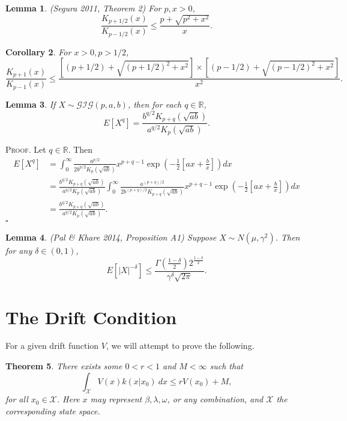 \documentclass[12pt]{article}
\newtheorem{theorem}{Theorem}
\newtheorem{lemma}[theorem]{Lemma}
\newtheorem{corollary}[theorem]{Corollary}
\newcounter{ProofCounter}
\newenvironment{Proof}{\stepcounter{ProofCounter}\textsc{Proof.}}{\hfill$\square$}
\begin{document}
\begin{lemma}
  (Segura 2011, Theorem 2)
  For $p, x > 0$, 
  \[
    \frac{K_{p+1/2}(x)}{K_{p-1/2}(x)} \leq \frac{p + \sqrt{p^2 + x^2}}{x}.
  \]
  \label{l4}
\end{lemma} 

\begin{corollary}
  For $x > 0, p > 1/2$,
  \[
    \frac{K_{p+1}(x)}{K_{p-1}(x)} \leq \frac{\left[(p+1/2) + \sqrt{(p+1/2)^2 + x^2}\right]\times\left[(p-1/2) + \sqrt{(p-1/2)^2 + x^2}\right]}{x^2}.
  \]
  \label{c1}
\end{corollary}

\begin{lemma}
  If $X \sim \mathcal{GIG}(p, a, b)$, then for each $q \in \mathbb{R}$,
  \[
    E[X^q] =\frac{b^{q/2}K_{p+q}(\sqrt{ab})}{a^{q/2}K_p(\sqrt{ab})}.
  \]
  \label{l5}
\end{lemma}
\begin{Proof}
  Let $q \in \mathbb{R}$. Then 
  \begin{align*}
    E[X^q] & = \int_{0}^{\infty} \frac{a^{p/2}}{2b^{p/2}K_p(\sqrt{ab})} x^{p+q-1}\exp\left( -\frac{1}{2}\left[ ax + \frac{b}{x} \right] \right)dx \\
    & = \frac{b^{q/2}K_{p+q}(\sqrt{ab})}{a^{q/2}K_p(\sqrt{ab})}
    \int_{0}^{\infty}\frac{a^{(p+q)/2}}{2b^{(p+q)/2}K_{p+q}(\sqrt{ab})} x^{p+q-1} \exp\left( -\frac{1}{2}\left[ ax + \frac{b}{x} \right] \right)dx \\
    & = \frac{b^{q/2}K_{p+q}(\sqrt{ab})}{a^{q/2}K_p(\sqrt{ab})}.
  \end{align*}
\end{Proof}

\begin{lemma}
  (Pal \& Khare 2014, Proposition A1)
  Suppose $X \sim N(\mu, \gamma^2)$. Then for any $\delta \in (0,1)$, 
  \[
    E\left[ |X|^{-\delta} \right] \leq \frac{\Gamma\left( \frac{1-\delta}{2} \right) 2^{\frac{1-\delta}{2}}}{\gamma^\delta \sqrt{2\pi}}.
  \]
  \label{l6}
\end{lemma}


\section{The Drift Condition}

For a given drift function $V$, we will attempt to prove the following. \\

\begin{theorem}
  There exists some $0 < r < 1$ and $M < \infty$ such that 
  \[
    \int_{\mathcal{X}} V(x)k(x|x_0)\ dx \leq r V(x_0) + M,
  \]
  for all $x_0 \in \mathcal{X}$. Here $x$ may represent $\beta, \lambda, \omega$, or any combination, and $\mathcal{X}$ the corresponding state space.
  \label{thm1}
\end{theorem}
\end{document}
